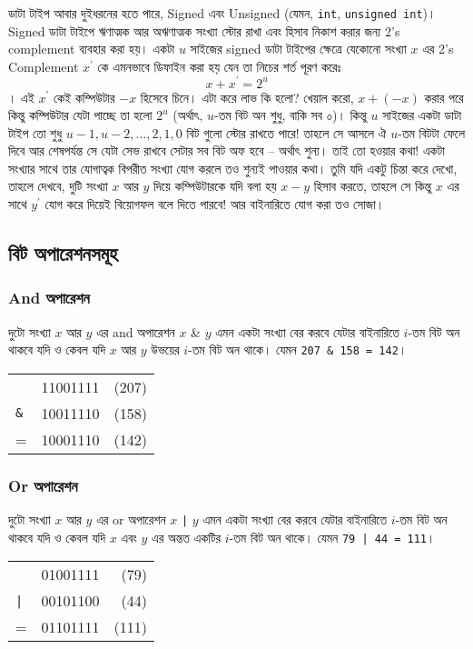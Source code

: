 ডাটা টাইপ আবার দুইধরনের হতে পারে, Signed এবং Unsigned (যেমন, \texttt{int}, \texttt{unsigned int})। Signed ডাটা টাইপে ঋণাত্মক আর অঋণাত্মক সংখ্যা স্টোর রাখা এবং হিসাব নিকাশ করার জন্য 2's complement ব্যবহার করা হয়। একটা $u$ সাইজের signed ডাটা টাইপের ক্ষেত্রে যেকোনো সংখ্যা $x$ এর 2's Complement $x^{\prime}$ কে এমনভাবে ডিফাইন করা হয় যেন তা নিচের শর্ত পূরণ করেঃ $$x + x^\prime = 2^u$$। এই $x^\prime$ কেই কম্পিউটার $-x$ হিসেবে চিনে। এটা করে লাভ কি হলো? খেয়াল করো, $x + (-x)$ করার পরে কিন্তু কম্পিউটার যেটা পাচ্ছে তা হলো $2^u$ (অর্থাৎ, $u$-তম বিট অন শুধু, বাকি সব ০)। কিন্তু $u$ সাইজের একটা ডাটা টাইপ তো শুধু $u-1, u-2, \ldots, 2, 1, 0$ বিট গুলো স্টোর রাখতে পারে! তাহলে সে আসলে ঐ $u$-তম বিটটা ফেলে দিবে আর শেষপর্যন্ত সে যেটা সেভ রাখবে সেটার সব বিট অফ হবে -- অর্থাৎ শুন্য। তাই তো হওয়ার কথা! একটা সংখ্যার সাথে তার যোগাত্বক বিপরীত সংখ্যা যোগ করলে তও শুন্যই পাওয়ার কথা। তুমি যদি একটু চিন্তা করে দেখো, তাহলে দেখবে, দুটি সংখ্যা $x$ আর $y$ দিয়ে কম্পিউটারকে যদি বলা হয় $x-y$ হিসাব করতে, তাহলে সে কিন্তু $x$ এর সাথে $y^\prime$ যোগ করে দিয়েই বিয়োগফল বলে দিতে পারবে! আর বাইনারিতে যোগ করা তও সোজা।

\subsection{বিট অপারেশনসমূহ}

\subsubsection{And অপারেশন}
দুটো সংখ্যা $x$ আর $y$ এর and অপারেশন $x$ \& $y$ এমন একটা সংখ্যা বের করবে যেটার বাইনারিতে $i$-তম বিট অন থাকবে যদি ও কেবল যদি $x$ আর $y$ উভয়ের $i$-তম বিট অন থাকে। যেমন \texttt{207 \& 158 = 142}।
\begin{center}
\begin{tabular}{llr}
    & 11001111 & (207)\\
    \texttt{\&} & 10011110 & (158)\\
    \hline
    = & 10001110 & (142)
\end{tabular}
\end{center}

\subsubsection{Or অপারেশন}
দুটো সংখ্যা $x$ আর $y$ এর or অপারেশন $x$ \texttt{|} $y$ এমন একটা সংখ্যা বের করবে যেটার বাইনারিতে $i$-তম বিট অন থাকবে যদি ও কেবল যদি $x$ এবং $y$ এর অন্তত একটির $i$-তম বিট অন থাকে। যেমন \texttt{79 | 44 = 111}।
\begin{center}
\begin{tabular}{llr}
    & 01001111 & (79)\\
    \texttt{|} & 00101100 & (44)\\
    \hline
    = & 01101111 & (111)
\end{tabular}
\end{center}

